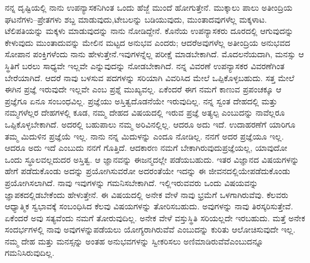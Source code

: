 ನನ್ನ ದೃಷ್ಟಿಯಲ್ಲಿ ನಾನು ಉಪನ್ಯಾಸಕನಿಗಿಂತ ಒಂದು ಹೆಜ್ಜೆ ಮುಂದೆ ಹೋಗುತ್ತೇನೆ. ಮುಕ್ಕಾಲು ಪಾಲು ಅತೀಂದ್ರಿಯ ಘಟನೆಗಳು–ಪ್ರೇತಗಳು ಶಬ್ದ ಮಾಡುವುದು,\break ಟೇಬಲನ್ನು ಬಡಿಯುವುದು, ಮುಂತಾದವುಗಳೆಲ್ಲ ಮಕ್ಕಳಾಟ. ಟೆಲಿಪತಿಯನ್ನು ಮಕ್ಕಳು ಮಾಡುವುದನ್ನು ನಾನು ನೋಡಿದ್ದೇನೆ. ಕೊನೆಯ ಉಪನ್ಯಾಸಕರು ದೂರದಲ್ಲಿ ಆಗುವುದನ್ನು ಕೇಳುವುದು ಮುಂತಾದುವನ್ನು ಮೇಲಿನ ಮಟ್ಟದ ಅನುಭವ ಎಂದರು; ಆದರೆ\break ಅವುಗಳೆಲ್ಲ ಅತೀಂದ್ರಿಯ ಅನುಭವದ ಸೋಪಾನ ಪಂಕ್ತಿಗಳೆಂದು ನಾನು ಹೇಳುತ್ತೇನೆ.\break ಇವುಗಳನ್ನೆಲ್ಲ ಪರೀಕ್ಷೆ ಮಾಡಬೇಕಾಗಿದೆ. ಮೊದಲನೆಯದಾಗಿ, ಮನಸ್ಸು ಆ ಸ್ಥಿತಿಗೆ ಬರಲು ಸಾಧ್ಯವೇ ಇಲ್ಲವೇ ಎನ್ನುವುದನ್ನು ನೋಡಬೇಕಾಗಿದೆ. ನನ್ನ ವಿವರಣೆ ಉಪನ್ಯಾಸಕರ ವಿವರಣೆಗಿಂತ ಬೇರೆಯಾಗಿದೆ. ಆದರೆ ನಾವು ಬಳಸುವ ಪದಗಳನ್ನು ಸರಿಯಾಗಿ ವಿವರಿಸಿದ ಮೇಲೆ ಒಪ್ಪಿಕೊಳ್ಳಬಹುದು. ಸತ್ತ ಮೇಲೆ ಈಗಿನ ಪ್ರಜ್ಞೆ ಇರುವುದೇ ಇಲ್ಲವೇ ಎಂಬ ಪ್ರಶ್ನೆ ಮುಖ್ಯವಲ್ಲ. ಏಕೆಂದರೆ ಈಗ ನಮಗೆ ಕಾಣುವ ಪ್ರಪಂಚಕ್ಕೂ ಆ ಪ್ರಜ್ಞೆಗೂ ಏನೂ ಸಂಬಂಧವಿಲ್ಲ. ಪ್ರಜ್ಞೆಯು ಅಸ್ತಿತ್ವದೊಡನೆಯೇ ಇರುವುದಿಲ್ಲ. ನನ್ನ ಸ್ವಂತ ದೇಹದಲ್ಲಿ ಮತ್ತು ನಮ್ಮಗಳೆಲ್ಲರ ದೇಹಗಳಲ್ಲಿ ಕೂಡ, ನಮ್ಮ ದೇಹದ ವಿಷಯದಲ್ಲಿ ಇರುವ ಪ್ರಜ್ಞೆ ಅತ್ಯಲ್ಪ ಎಂಬುದನ್ನು ನಾವೆಲ್ಲರೂ ಒಪ್ಪಿಕೊಳ್ಳಬೇಕಾಗಿದೆ. ಅದರಲ್ಲಿ ಬಹುಪಾಲು ನಮ್ಮ ಅರಿವಿನಲ್ಲಿಲ್ಲ. ಆದರೂ ಅದು ಇದೆ. ಉದಾಹರಣೆಗೆ ಯಾರಿಗೂ ತಮ್ಮ ಮಿದುಳಿನ ಪ್ರಜ್ಞೆಯೆ ಇಲ್ಲ. ನಾನು ನನ್ನ ಮಿದುಳನ್ನು ಎಂದೂ ನೋಡಿಲ್ಲ. ನನಗೆ ಅದರ ಪ್ರಜ್ಞೆಯೂ ಇಲ್ಲ. ಆದರೂ ಅದು ಇದೆ ಎಂಬುದು ನನಗೆ ಗೊತ್ತಿದೆ. ಆದಕಾರಣ ನಮಗೆ ಬೇಕಾಗಿರುವುದು\break ಪ್ರಜ್ಞೆಯಲ್ಲ, ಯಾವುದೋ ಒಂದು ಸ್ಥೂಲವಲ್ಲದುದರ ಅಸ್ತಿತ್ವ. ಆ ಜ್ಞಾನವನ್ನು ಈ\break ಜನ್ಮದಲ್ಲೇ ಪಡೆಯಬಹುದು. ಇತರ ವಿಜ್ಞಾನದ ವಿಷಯಗಳನ್ನು ಹೇಗೆ ಪಡೆದುಕೊಂಡು ಅದನ್ನು ಪ್ರಯೋಗಿಸುವರೋ ಅದರಂತೆಯೇ ಇದನ್ನು ಈ ಜೀವನದಲ್ಲಿಯೇ\break ಪಡೆದುಕೊಂಡು ಪ್ರಯೋಗಿಸಲಾಗಿದೆ. ನಾವು ಇವುಗಳನ್ನು ಗಮನಿಸಬೇಕಾಗಿದೆ. ಇಲ್ಲಿ\break ಇರುವವರು ಒಂದು ವಿಷಯವನ್ನು ಜ್ಞಾಪಕದಲ್ಲಿಡಬೇಕೆಂದು ಹೇಳುತ್ತೇನೆ. ಈ ವಿಷಯದಲ್ಲಿ ಅನೇಕ ವೇಳೆ ನಾವು ಭ್ರಮೆಗೆ ಒಳಗಾಗಿರುವೆವು. ಕೆಲವರು ಆಧ್ಯಾತ್ಮಿಕ ಸ್ವಭಾವಕ್ಕೆ ಸಂಬಂಧಿಸಿದ ಕೆಲವು ವಿಷಯಗಳನ್ನು ತೋರಿಸಬಹುದು. ಅವುಗಳನ್ನು ನಾವು ತಿರಸ್ಕರಿಸುತ್ತೇವೆ. ಏಕೆಂದರೆ ಅವು ಸತ್ಯವೆಂದು ನಮಗೆ ತೋರುವುದಿಲ್ಲ. ಅನೇಕ ವೇಳೆ ವಸ್ತುಸ್ಥಿತಿ ಸರಿಯಲ್ಲದೇ ಇರಬಹುದು. ಮತ್ತೆ ಅನೇಕ ಸಂದರ್ಭಗಳಲ್ಲಿ ನಾವು ಅವುಗಳನ್ನು\break ಪಡೆಯಲು ಯೋಗ್ಯರಾಗಿರುವೆವೆ ಎಂಬುದನ್ನು ಕುರಿತು ಆಲೋಚಿಸುವುದೇ ಇಲ್ಲ. ನಮ್ಮ ದೇಹ ಮತ್ತು ಮನಸ್ಸನ್ನು ಅಂತಹ ಅನುಭವಗಳನ್ನು ಸ್ವೀಕರಿಸಲು ಅಣಿಮಾಡಿರುವೆವೆ\break ಎಂಬುದನ್ನೂ ಗಮನಿಸಿರುವುದಿಲ್ಲ.

